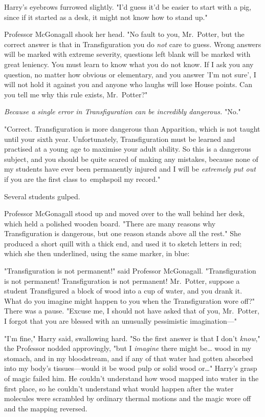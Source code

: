 Harry's eyebrows furrowed slightly. "I'd guess it'd be easier to start with a 
pig, since if it started as a desk, it might not know how to stand up."

Professor McGonagall shook her head. "No fault to you, Mr.~Potter, but the 
correct answer is that in Transfiguration you do \emph{not} care to guess. 
Wrong answers will be marked with extreme severity, questions left blank will 
be marked with great leniency. You must learn to know what you do not know. If 
I ask you any question, no matter how obvious or elementary, and you answer 
'I'm not sure', I will not hold it against you and anyone who laughs will lose 
House points. Can you tell me why this rule exists, Mr.~Potter?"

\emph{Because a single error in Transfiguration can be incredibly dangerous.} 
"No."

"Correct. Transfiguration is more dangerous than Apparition, which is not 
taught until your sixth year. Unfortunately, Transfiguration must be learned 
and practised at a young age to maximise your adult ability. So this is a 
dangerous subject, and you should be quite scared of making any mistakes, 
because none of my students have ever been permanently injured and I will be 
\emph{extremely put out} if you are the first class to\ emph{spoil my record}."

Several students gulped.

Professor McGonagall stood up and moved over to the wall behind her desk, which 
held a polished wooden board. "There are many reasons why Transfiguration is 
dangerous, but one reason stands above all the rest." She produced a short 
quill with a thick end, and used it to sketch letters in red; which she then 
underlined, using the same marker, in blue:


"Transfiguration is not permanent!" said Professor McGonagall. "Transfiguration 
is not permanent! Transfiguration is not permanent! Mr.~Potter, suppose a 
student Transfigured a block of wood into a cup of water, and you drank it. 
What do you imagine might happen to you when the Transfiguration wore off?" 
There was a pause. "Excuse me, I should not have asked that of you, Mr.~Potter, 
I forgot that you are blessed with an unusually pessimistic imagination---"

"I'm fine," Harry said, swallowing hard. "So the first answer is that I don't 
\emph{know}," the Professor nodded approvingly, "but I \emph{imagine} there 
might be{\ldots} wood in my stomach, and in my bloodstream, and if any of that 
water had gotten absorbed into my body's tissues---would it be wood pulp or 
solid wood or{\ldots}" Harry's grasp of magic failed him. He couldn't 
understand how wood mapped into water in the first place, so he couldn't 
understand what would happen after the water molecules were scrambled by 
ordinary thermal motions and the magic wore off and the mapping reversed.

